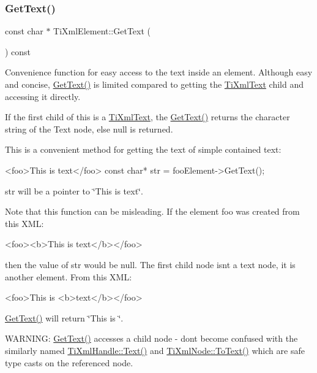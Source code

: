 \subsubsection{\texorpdfstring{Get\+Text()}{GetText()}}
{\footnotesize\ttfamily const char $\ast$ Ti\+Xml\+Element\+::\+Get\+Text (\begin{DoxyParamCaption}{ }\end{DoxyParamCaption}) const}

Convenience function for easy access to the text inside an element. Although easy and concise, \hyperlink{class_ti_xml_element_af0f814ecbd43d50d4cdbdf4354d3da39}{Get\+Text()} is limited compared to getting the \hyperlink{class_ti_xml_text}{Ti\+Xml\+Text} child and accessing it directly.

If the first child of \textquotesingle{}this\textquotesingle{} is a \hyperlink{class_ti_xml_text}{Ti\+Xml\+Text}, the \hyperlink{class_ti_xml_element_af0f814ecbd43d50d4cdbdf4354d3da39}{Get\+Text()} returns the character string of the Text node, else null is returned.

This is a convenient method for getting the text of simple contained text\+: \begin{DoxyVerb}<foo>This is text</foo>
const char* str = fooElement->GetText();
\end{DoxyVerb}


\textquotesingle{}str\textquotesingle{} will be a pointer to \char`\"{}\+This is text\char`\"{}.

Note that this function can be misleading. If the element foo was created from this X\+ML\+: \begin{DoxyVerb}<foo><b>This is text</b></foo> 
\end{DoxyVerb}


then the value of str would be null. The first child node isn\textquotesingle{}t a text node, it is another element. From this X\+ML\+: \begin{DoxyVerb}<foo>This is <b>text</b></foo> 
\end{DoxyVerb}
 \hyperlink{class_ti_xml_element_af0f814ecbd43d50d4cdbdf4354d3da39}{Get\+Text()} will return \char`\"{}\+This is \char`\"{}.

W\+A\+R\+N\+I\+NG\+: \hyperlink{class_ti_xml_element_af0f814ecbd43d50d4cdbdf4354d3da39}{Get\+Text()} accesses a child node -\/ don\textquotesingle{}t become confused with the similarly named \hyperlink{class_ti_xml_handle_ad3b502c72059421e4dfcc7bda3c392fe}{Ti\+Xml\+Handle\+::\+Text()} and \hyperlink{class_ti_xml_node_a3ddfbcac78fbea041fad57e5c6d60a03}{Ti\+Xml\+Node\+::\+To\+Text()} which are safe type casts on the referenced node. \mbox{\label{class_ti_xml_element_aa31a15cddfb8601a31236fe7d2569fb4}} 
